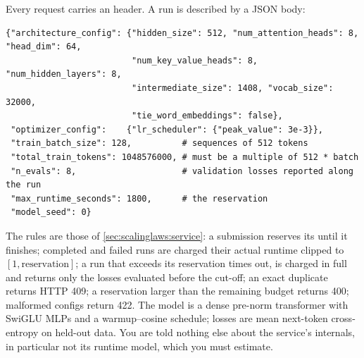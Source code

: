 Every request carries an  header. A run is described by a JSON body:
\begin{lstlisting}[style=plain]
{"architecture_config": {"hidden_size": 512, "num_attention_heads": 8, "head_dim": 64,
                         "num_key_value_heads": 8, "num_hidden_layers": 8,
                         "intermediate_size": 1408, "vocab_size": 32000,
                         "tie_word_embeddings": false},
 "optimizer_config":    {"lr_scheduler": {"peak_value": 3e-3}},
 "train_batch_size": 128,          # sequences of 512 tokens
 "total_train_tokens": 1048576000, # must be a multiple of 512 * batch
 "n_evals": 8,                     # validation losses reported along the run
 "max_runtime_seconds": 1800,      # the reservation
 "model_seed": 0}
\end{lstlisting}
The rules are those of \cref{sec:scalinglaws:service}: a submission reserves its
 until it finishes; completed and failed runs are charged their
actual runtime clipped to $[1,\text{reservation}]$; a run that exceeds its reservation times out,
is charged in full and returns only the losses evaluated before the cut-off; an exact duplicate
returns HTTP 409; a reservation larger than the remaining budget returns 400; malformed configs
return 422. The model is a dense pre-norm transformer with SwiGLU MLPs and a warmup--cosine
schedule; losses are mean next-token cross-entropy on held-out data. You are told nothing else
about the service's internals, in particular not its runtime model, which you must estimate.

